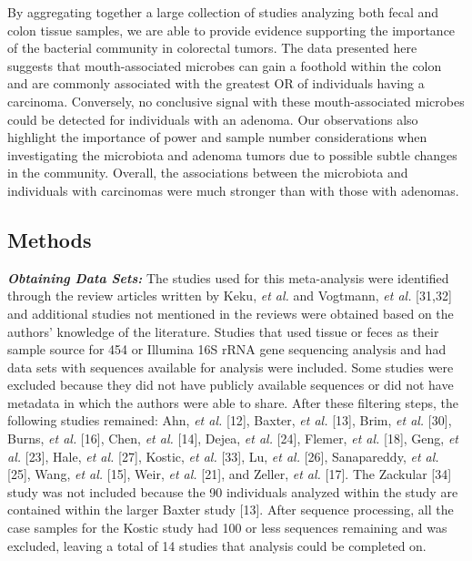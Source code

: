 \documentclass[12pt,]{article}
\begin{document}
By aggregating together a large collection of studies analyzing both
fecal and colon tissue samples, we are able to provide evidence
supporting the importance of the bacterial community in colorectal
tumors. The data presented here suggests that mouth-associated microbes
can gain a foothold within the colon and are commonly associated with
the greatest OR of individuals having a carcinoma. Conversely, no
conclusive signal with these mouth-associated microbes could be detected
for individuals with an adenoma. Our observations also highlight the
importance of power and sample number considerations when investigating
the microbiota and adenoma tumors due to possible subtle changes in the
community. Overall, the associations between the microbiota and
individuals with carcinomas were much stronger than with those with
adenomas.

\newpage

\subsection{Methods}\label{methods}

\textbf{\emph{Obtaining Data Sets:}} The studies used for this
meta-analysis were identified through the review articles written by
Keku, \emph{et al.} and Vogtmann, \emph{et al.} {[}31,32{]} and
additional studies not mentioned in the reviews were obtained based on
the authors' knowledge of the literature. Studies that used tissue or
feces as their sample source for 454 or Illumina 16S rRNA gene
sequencing analysis and had data sets with sequences available for
analysis were included. Some studies were excluded because they did not
have publicly available sequences or did not have metadata in which the
authors were able to share. After these filtering steps, the following
studies remained: Ahn, \emph{et al.} {[}12{]}, Baxter, \emph{et al.}
{[}13{]}, Brim, \emph{et al.} {[}30{]}, Burns, \emph{et al.} {[}16{]},
Chen, \emph{et al.} {[}14{]}, Dejea, \emph{et al.} {[}24{]}, Flemer,
\emph{et al.} {[}18{]}, Geng, \emph{et al.} {[}23{]}, Hale, \emph{et
al.} {[}27{]}, Kostic, \emph{et al.} {[}33{]}, Lu, \emph{et al.}
{[}26{]}, Sanapareddy, \emph{et al.} {[}25{]}, Wang, \emph{et al.}
{[}15{]}, Weir, \emph{et al.} {[}21{]}, and Zeller, \emph{et al.}
{[}17{]}. The Zackular {[}34{]} study was not included because the 90
individuals analyzed within the study are contained within the larger
Baxter study {[}13{]}. After sequence processing, all the case samples
for the Kostic study had 100 or less sequences remaining and was
excluded, leaving a total of 14 studies that analysis could be completed
on.
\end{document}
